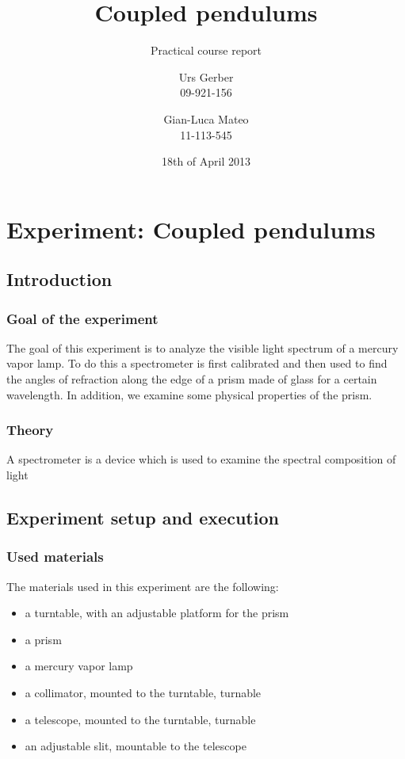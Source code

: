 \documentclass{scrreprt}
\author{Urs Gerber\\09-921-156 \and Gian-Luca Mateo\\11-113-545}
\date{18th of April 2013}
\title{Coupled pendulums}
\subtitle{Practical course report}
\begin{document}
\maketitle

\tableofcontents
\newpage

\chapter{Experiment: Coupled pendulums}

\section{Introduction}

\subsection{Goal of the experiment}
The goal of this experiment is to analyze the visible light spectrum of a mercury vapor lamp. To do this a spectrometer is first calibrated and then used to find the angles of refraction along the edge of a prism made of glass for a certain wavelength. In addition, we examine some physical properties of the prism.
 
\subsection{Theory}
A spectrometer is a device which is used to examine the spectral composition of light 

\section{Experiment setup and execution}

\subsection{Used materials}
The materials used in this experiment are the following:
\begin{itemize}
\item a turntable, with an adjustable platform for the prism
\item a prism
\item a mercury vapor lamp
\item a collimator, mounted to the turntable, turnable 
\item a telescope, mounted to the turntable, turnable
\item an adjustable slit, mountable to the telescope
\end{itemize}
\end{document}
